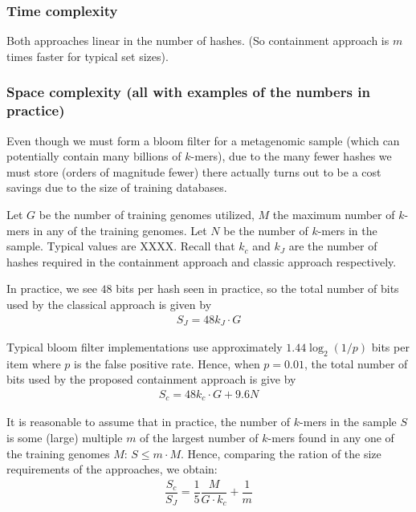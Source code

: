 \documentclass[11pt]{amsart}
\theoremstyle{remark}
\numberwithin{equation}{section}
\begin{document}
\subsubsection{Time complexity}
Both approaches linear in the number of hashes. (So containment approach is $m$ times faster for typical set sizes).
\subsubsection{Space complexity (all with examples of the numbers in practice)}
Even though we must form a bloom filter for a metagenomic sample (which can potentially contain many billions of $k$-mers), due to the many fewer hashes we must store (orders of magnitude fewer) there actually turns out to be a cost savings due to the size of training databases.

Let $G$ be the number of training genomes utilized, $M$ the maximum number of $k$-mers in any of the training genomes. Let $N$ be the number of $k$-mers in the sample. Typical values are XXXX. Recall that $k_c$ and $k_J$ are the number of hashes required in the containment approach and classic approach respectively.

In practice, we see $48$ bits per hash seen in practice, so the total number of bits used by the classical approach is given by
\begin{align*}
S_J = 48k_J\cdot  G
\end{align*}


Typical bloom filter implementations use approximately $1.44\log_2(1/p)$ bits per item where $p$ is the false positive rate. Hence, when $p = 0.01$, the total number of bits used by the proposed containment approach is give by
\begin{align*}
S_c = 48k_c \cdot G + 9.6N
\end{align*}

It is reasonable to assume that in practice, the number of $k$-mers in the sample $S$ is some (large) multiple $m$ of the largest number of $k$-mers found in any one of the training genomes $M$: $S \leq m\cdot  M$. Hence, comparing the ration of the size requirements of the approaches, we obtain:
\begin{align*}
\dfrac{S_c}{S_J} = \dfrac{1}{5}\dfrac{M}{G\cdot  k_c}+\dfrac{1}{m}
\end{align*}
\end{document}
